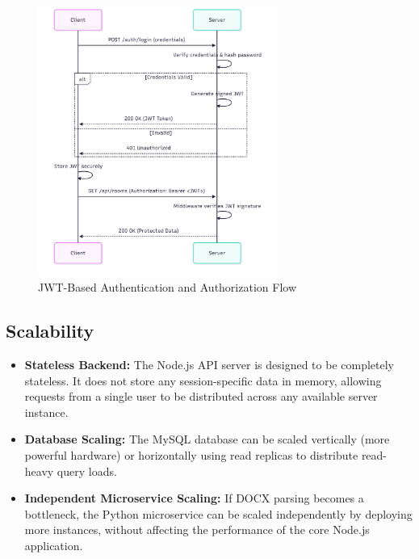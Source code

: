 \begin{figure}[htbp]
\centering
\includegraphics[width=0.7\textwidth]{figures/jwt-flow.png}
\caption{JWT-Based Authentication and Authorization Flow}
\label{fig:jwt-flow}
\end{figure}

\subsection{Scalability}
\begin{itemize}
    \item \textbf{Stateless Backend:} The Node.js API server is designed to be completely stateless. It does not store any session-specific data in memory, allowing requests from a single user to be distributed across any available server instance.
    \item \textbf{Database Scaling:} The MySQL database can be scaled vertically (more powerful hardware) or horizontally using read replicas to distribute read-heavy query loads.
    \item \textbf{Independent Microservice Scaling:} If DOCX parsing becomes a bottleneck, the Python microservice can be scaled independently by deploying more instances, without affecting the performance of the core Node.js application.
\end{itemize}
